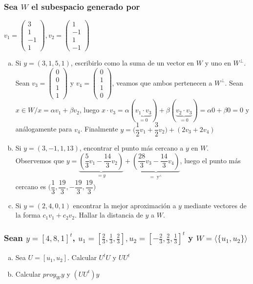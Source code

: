 \documentclass{article}
\begin{document}
\subsubsection{Sea $W$ el subespacio generado por}
$v_1 = \begin{pmatrix}3\\1\\-1\\1\end{pmatrix}, v_2 = \begin{pmatrix}1\\-1\\1\\-1\end{pmatrix}$
\begin{enumerate}[a.]
\item
	Si $y = (3,1,5,1)$, escribirlo como la suma de un vector en $W$ y uno en $W^\bot$. \\
	Sean $v_3 = \begin{pmatrix}0\\0\\1\\1\end{pmatrix}$ y $v_4 = \begin{pmatrix}0\\1\\1\\0\end{pmatrix}$,
	veamos que ambos pertenecen a $W^\bot$. Sean $x \in W / x = \alpha v_1 + \beta v_2$, luego
	$x \cdot v_3 = \alpha(\underbrace{v_1 \cdot v_3}_{= 0}) + \beta (\underbrace{v_2 \cdot v_3}_{= 0})
	 = \alpha 0 + \beta 0 = 0$ y análogamente
	para $v_4$. Finalmente $y = \Big(\dfrac{1}2 v_1 + \dfrac{3}2 v_2 \Big) + (2 v_3 + 2v_4)$
\item
	Si $y = (3,-1,1,13)$, encontrar el punto más cercano a $y$ en $W$. \\
	Observemos que $y = \underbrace{(\dfrac{5}3 v_1 - \dfrac{14}3 v_2)}_{\displaystyle =y} + 
	\underbrace{(\dfrac{28}3 v_3 - \dfrac{14}3 v_4)}_{= \displaystyle \mathop{y}^\wedge}$, luego el
	punto más cercano es $\Big (\dfrac{1}3,\dfrac{19}3,-\dfrac{19}3,\dfrac{19}3 \Big )$
\item
	Si $y = (2,4,0,1)$ encontrar la mejor aproximación a $y$ mediante vectores de la forma
	$c_1v_1 + c_2v_2$. Hallar la distancia de $y$ a $W$. \\
\end{enumerate}

\subsubsection{Sean $y = [4,8,1]^t$, $u_1 = [\frac{2}3,\frac{1}3,\frac{2}3],u_2 = [ -\frac{2}3, \frac{2}3,\frac{1}3 ]^t$
y $W = \langle \{ u_1 , u_2 \} \rangle$}
\begin{enumerate}[a.]
\item
	Sea $U = [u_1,u_2]$. Calcular $U^tU$ y $UU^t$
\item
	Calcular ${proy}_W y$ y $(UU^t)y$
\end{enumerate}
\end{document}
